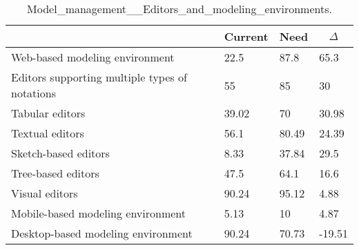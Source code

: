 
  \begin{table*}[]
  \centering
  \notsotiny
  \caption{ Model_management__Editors_and_modeling_environments.}
\label{tab:model_management__editors_and_modeling_environments}
\begin{tabular}{|l|l|l|l|}
  \hline
  \rowcolor[HTML]{C0C0C0}
    \multicolumn{1}{|c|}{Feature} & \multicolumn{1}{c|}{Current} & \multicolumn{1}{c|}{Need} & \multicolumn{1}{c|}{$\Delta$} \\ \hline
  Web-based modeling environment & 22.5 & 87.8 & 65.3 \\ \hline 
Editors supporting multiple types of notations & 55 & 85 & 30 \\ \hline 
Tabular editors & 39.02 & 70 & 30.98 \\ \hline 
Textual editors & 56.1 & 80.49 & 24.39 \\ \hline 
Sketch-based editors & 8.33 & 37.84 & 29.5 \\ \hline 
Tree-based editors & 47.5 & 64.1 & 16.6 \\ \hline 
Visual editors & 90.24 & 95.12 & 4.88 \\ \hline 
Mobile-based modeling environment & 5.13 & 10 & 4.87 \\ \hline 
Desktop-based modeling environment & 90.24 & 70.73 & -19.51 \\ \hline 
\end{tabular}%
  \end{table*}
